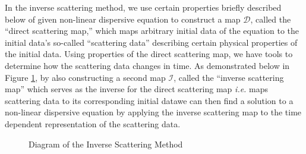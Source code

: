 \documentclass[../dissertation.tex]{subfiles}
\begin{document}
In the inverse scattering method, 
we use certain properties briefly described below of given non-linear dispersive 
equation to construct a map $\mathscr D$, called the ``direct 
scattering map,'' which maps arbitrary 
initial data of 
the equation to the initial data's 
so-called ``scattering data'' describing certain physical properties of the 
initial data. Using properties of the direct scattering map, we have tools to determine 
how the scattering data changes in time. As demonstrated below in Figure 
\ref{fig:IST}, by also constructing a second map $\mathcal I$, called the 
``inverse scattering map''
which serves as the inverse for the direct scattering map \textemdash{}\textit{i.e.} maps 
scattering data to its corresponding initial data\textemdash{}we can then find 
a solution to a non-linear dispersive equation by applying the inverse scattering map to 
the time dependent representation of the scattering data.

\begin{figure}[h!]
	\centering
    \caption{Diagram of the Inverse Scattering Method}
    \label{fig:IST}
\end{figure}
\end{document}
